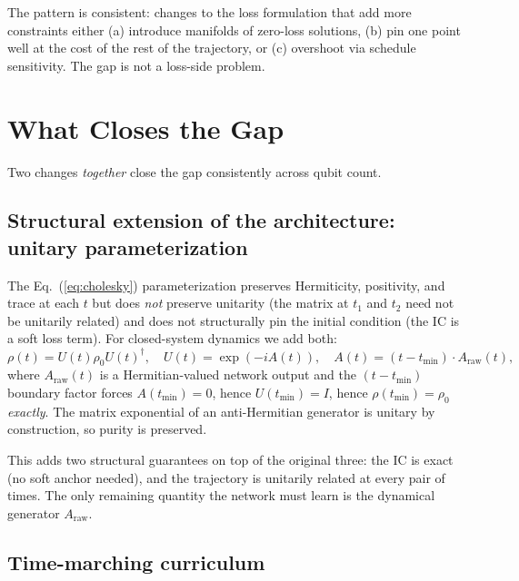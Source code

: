 \documentclass[11pt]{article}
\begin{document}
The pattern is consistent: changes to the loss formulation that add more constraints either (a) introduce manifolds of zero-loss solutions, (b) pin one point well at the cost of the rest of the trajectory, or (c) overshoot via schedule sensitivity. The gap is not a loss-side problem.

\section{What Closes the Gap}

Two changes \emph{together} close the gap consistently across qubit count.

\subsection{Structural extension of the architecture: unitary parameterization}

The Eq.~(\ref{eq:cholesky}) parameterization preserves Hermiticity, positivity, and trace at each $t$ but does \emph{not} preserve unitarity (the matrix at $t_1$ and $t_2$ need not be unitarily related) and does not structurally pin the initial condition (the IC is a soft loss term). For closed-system dynamics we add both:
\begin{equation}
\rho(t) = U(t) \rho_0 U(t)^\dagger, \quad U(t) = \exp(-i A(t)), \quad A(t) = (t - t_{\min}) \cdot A_{\mathrm{raw}}(t),
\label{eq:unitary}
\end{equation}
where $A_{\mathrm{raw}}(t)$ is a Hermitian-valued network output and the $(t - t_{\min})$ boundary factor forces $A(t_{\min}) = 0$, hence $U(t_{\min}) = I$, hence $\rho(t_{\min}) = \rho_0$ \emph{exactly}. The matrix exponential of an anti-Hermitian generator is unitary by construction, so purity is preserved.

This adds two structural guarantees on top of the original three: the IC is exact (no soft anchor needed), and the trajectory is unitarily related at every pair of times. The only remaining quantity the network must learn is the dynamical generator $A_{\mathrm{raw}}$.

\subsection{Time-marching curriculum}
\end{document}
